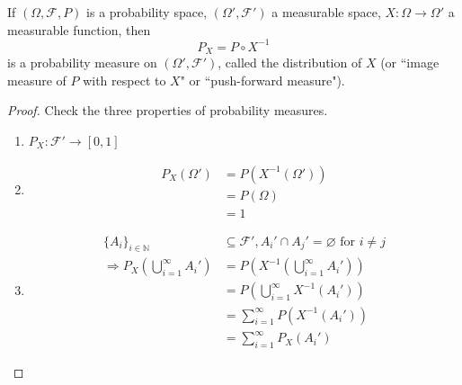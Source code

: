 \documentclass{article}
\newcommand{\inv}{^{-1}}
\begin{document}
	\begin{myprop}{}{}
		If $(\Omega, \mathcal{F}, P)$ is a probability space, $(\Omega', \mathcal{F}')$ a measurable space, $X : \Omega\to\Omega'$ a measurable function, then $$P_X=P\circ X\inv$$ is a probability measure on $(\Omega', \mathcal{F}')$, called the distribution of $X$ (or ``image measure of $P$ with respect to $X$" or ``push-forward measure").
		
		\begin{proof}
			Check the three properties of probability measures.
			\begin{enumerate}[label=(\roman*)]
				\item $P_X : \mathcal{F}'\to[0, 1]$
				
				\item 
				\begin{align*}
					P_X(\Omega')&=P(X\inv(\Omega'))\\
					&=P(\Omega)\\
					&=1
				\end{align*}
				
				\item
				\begin{align*}
					\{A_i\}_{i\in\mathbb{N}}&\subseteq\mathcal{F}', A_i'\cap A_j'=\varnothing \mbox{ for }i\neq j\\
					\Rightarrow P_X(\bigcup_{i=1}^{\infty}A_i')&=P(X\inv(\bigcup_{i=1}^{\infty}A_i'))\\
					&=P(\bigcup_{i=1}^{\infty}X\inv(A_i'))\\
					&=\sum_{i=1}^{\infty}P(X\inv(A_i'))\\
					&=\sum_{i=1}^{\infty}P_X(A_i')
				\end{align*}
			\end{enumerate}
		\end{proof}
	\end{myprop}
	
\end{document}
